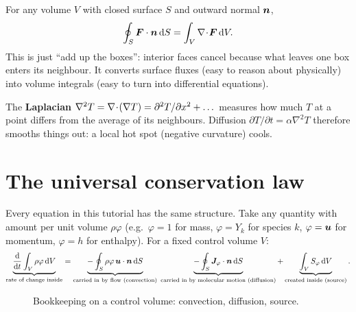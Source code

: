 \begin{keypoint}
For any volume $V$ with closed surface $S$ and outward normal $\bm{n}$,
\begin{equation}
  \oint_S \bm F\cdot\bm{n}\,\mathrm{d} S = \int_V \nabla\!\cdot\!\bm F\,\mathrm{d} V.
  \label{eq:gauss}
\end{equation}
This is just ``add up the boxes'': interior faces cancel because what leaves one box enters its
neighbour. It converts surface fluxes (easy to reason about physically) into volume integrals
(easy to turn into differential equations).
\end{keypoint}

The \textbf{Laplacian} $\nabla^2 T = \nabla\!\cdot\!(\nabla T) = \partial^2 T/\partial x^2+\dots$ measures how
much $T$ at a point differs from the average of its neighbours. Diffusion $\partial T/\partial t
= \alpha\nabla^2 T$ therefore smooths things out: a local hot spot (negative curvature) cools.

\section{The universal conservation law}
\label{sec:conslaw}

Every equation in this tutorial has the same structure. Take any quantity with amount per unit
volume $\rho\varphi$ (e.g.\ $\varphi=1$ for mass, $\varphi=Y_k$ for species $k$, $\varphi=\bm{u}$ for
momentum, $\varphi=h$ for enthalpy). For a fixed control volume $V$:
\[
\underbrace{\frac{\mathrm{d} }{\mathrm{d} t}\int_V \rho\varphi\,\mathrm{d} V}_{\text{rate of change inside}}
= \underbrace{-\oint_S \rho\varphi\,\bm{u}\cdot\bm{n}\,\mathrm{d} S}_{\text{carried in by flow (convection)}}
\;\underbrace{-\oint_S \bm J_\varphi\cdot\bm{n}\,\mathrm{d} S}_{\text{carried in by molecular motion (diffusion)}}
+\underbrace{\int_V S_\varphi\,\mathrm{d} V}_{\text{created inside (source)}} .
\]

\begin{figure}[H]
\centering
{}
\caption{Bookkeeping on a control volume: convection, diffusion, source.}
\end{figure}

